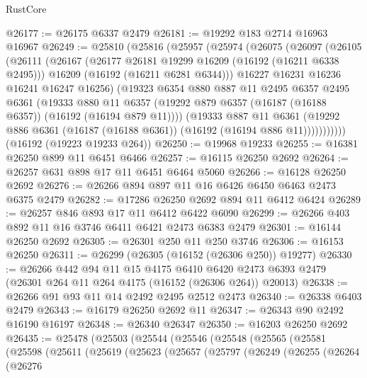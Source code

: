\begin{lexlean}{RustCore}
\begin{coremodule}
@26177 := @26175 @6337 @2479
@26181 := @19292 @183 @2714 @16963 @16967
@26249 := @25810
    (@25816
      (@25957
        (@25974
          (@26075
            (@26097
              (@26105
                (@26111
                  (@26167
                    (@26177 @26181 @19299 @16209 (@16192 (@16211 @6338 @2495)))
                    @16209
                    (@16192 (@16211 @6281 @6344)))
                  @16227
                  @16231
                  @16236
                  @16241
                  @16247
                  @16256)
                (@19323
                  @6354
                  @880
                  @887
                  @11
                  @2495
                  @6357
                  @2495
                  @6361
                  (@19333
                    @880
                    @11
                    @6357
                    (@19292 @879 @6357 (@16187 (@16188 @6357)) (@16192 (@16194 @879 @11))))
                  (@19333
                    @887
                    @11
                    @6361
                    (@19292 @886 @6361 (@16187 (@16188 @6361)) (@16192 (@16194 @886 @11)))))))))))
    (@16192 (@19223 @19233 @264))
@26250 := @19968 @19233
@26255 := @16381 @26250 @899 @11 @6451 @6466
@26257 := @16115 @26250 @2692
@26264 := @26257 @631 @898 @17 @11 @6451 @6464 @5060
@26266 := @16128 @26250 @2692
@26276 := @26266 @894 @897 @11 @16 @6426 @6450 @6463 @2473 @6375 @2479
@26282 := @17286 @26250 @2692 @894 @11 @6412 @6424
@26289 := @26257 @846 @893 @17 @11 @6412 @6422 @6090
@26299 := @26266 @403 @892 @11 @16 @3746 @6411 @6421 @2473 @6383 @2479
@26301 := @16144 @26250 @2692
@26305 := @26301 @250 @11 @250 @3746
@26306 := @16153 @26250
@26311 := @26299 (@26305 (@16152 (@26306 @250)) @19277)
@26330 := @26266
    @442
    @94
    @11
    @15
    @4175
    @6410
    @6420
    @2473
    @6393
    @2479
    (@26301 @264 @11 @264 @4175 (@16152 (@26306 @264)) @20013)
@26338 := @26266 @91 @93 @11 @14 @2492 @2495 @2512 @2473
@26340 := @26338 @6403 @2479
@26343 := @16179 @26250 @2692 @11
@26347 := @26343 @90 @2492 @16190 @16197
@26348 := @26340 @26347
@26350 := @16203 @26250 @2692
@26435 := @25478
    (@25503
      (@25544
        (@25546
          (@25548
            (@25565
              (@25581
                (@25598
                  (@25611
                    (@25619
                      (@25623
                        (@25657
                          (@25797
                            (@26249
                              (@26255
                                (@26264
                                  (@26276

\end{coremodule}
\end{lexlean}
